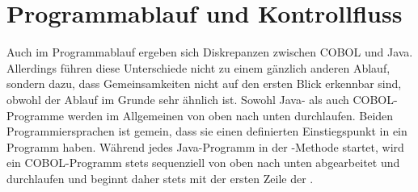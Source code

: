 \section{Programmablauf und Kontrollfluss}\label{programmablauf}
Auch im Pro\-gramm\-ab\-lauf ergeben sich Diskrepanzen zwischen COBOL und Java. Allerdings führen diese Unterschiede nicht zu einem gänzlich anderen Ablauf, sondern dazu, dass Gemeinsamkeiten nicht auf den ersten Blick erkennbar sind, obwohl der Ablauf im Grunde sehr ähnlich ist. Sowohl Java- als auch COBOL-Programme werden im Allgemeinen von oben nach unten durchlaufen. Beiden Programmiersprachen ist gemein, dass sie einen definierten Einstiegspunkt in ein Programm haben. Während jedes Java-Programm in der -Methode startet, wird ein COBOL-Programm stets sequenziell von oben nach unten abgearbeitet und durchlaufen und beginnt daher stets mit der ersten Zeile der .


%




